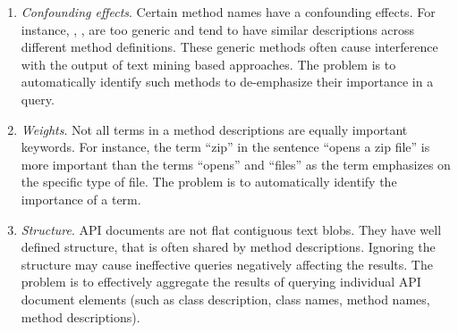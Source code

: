 \begin{enumerate}
		
	\item \textit{Confounding effects}. Certain method names have a confounding effects. For instance, , ,  are too generic and tend to have similar descriptions across different method definitions. These generic methods often cause interference with the output of text mining based approaches. The problem is to automatically identify such methods to de-emphasize their importance in a query. 
	
	\item \textit{Weights}. Not all terms in a method descriptions are equally important keywords. For instance, the term ``zip'' in the sentence ``opens a zip file'' is more important than the terms ``opens'' and ``files'' as the term emphasizes on the specific type of file. The problem is to automatically identify the importance of a term.
	
	\item \textit{Structure}. API documents are not flat contiguous text blobs. They have well defined structure, that is often shared by method descriptions. Ignoring the structure may cause ineffective queries negatively affecting the results. The problem is to effectively aggregate the results of querying individual API document elements (such as class description, class names, method names, method descriptions).
			
	
\end{enumerate}
